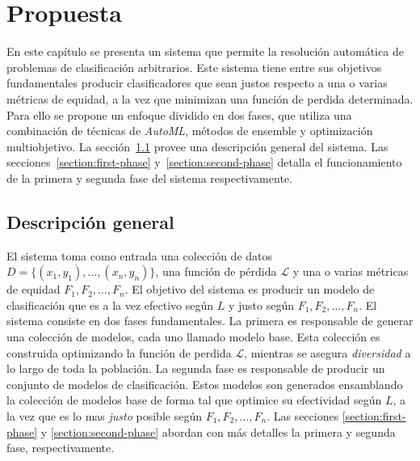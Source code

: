 \chapter{Propuesta}\label{chapter:proposal}

En este capítulo se presenta un sistema que permite la resolución automática de problemas de clasificación arbitrarios.
Este sistema tiene entre sus objetivos fundamentales producir clasificadores que sean justos respecto a una o varias métricas de equidad, a la vez que minimizan una función de perdida determinada.
Para ello se propone un enfoque dividido en dos fases, que utiliza una combinación de técnicas de \emph{AutoML}, métodos de ensemble y optimización multiobjetivo.
La sección~\ref{section:overview} provee una descripción general del sistema.
Las secciones~\ref{section:first-phase} y~\ref{section:second-phase} detalla el funcionamiento de la primera y segunda fase del sistema respectivamente.

\section{Descripción general}\label{section:overview}

El sistema toma como entrada una colección de datos $D = \{(x_1, y_1), \dots , (x_n, y_n)\}$, una función de pérdida $\mathcal{L}$ y una o varias métricas de equidad $F_1, F_2, \dots, F_n$.
El objetivo del sistema es producir un modelo de clasificación que es a la vez efectivo según $L$ y justo según $F_1, F_2, \dots, F_n$.
El sistema consiste en dos fases fundamentales.
La primera es responsable de generar una colección de modelos, cada uno llamado modelo base.
Esta colección es construida optimizando la función de perdida $\mathcal{L}$, mientras se asegura \emph{diversidad} a lo largo de toda la población.
La segunda fase es responsable de producir un conjunto de modelos de clasificación.
Estos modelos son generados ensamblando la colección de modelos base de forma tal que optimice su efectividad según $L$, a la vez que es lo mas \emph{justo} posible según $F_1, F_2, \dots, F_n$.
Las secciones \ref{section:first-phase} y \ref{section:second-phase} abordan con más detalles la primera y segunda fase, respectivamente.



